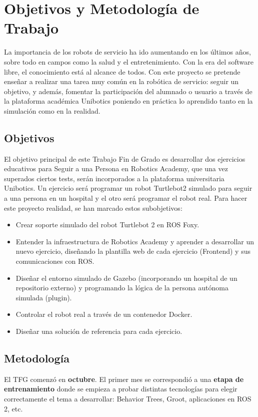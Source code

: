 \chapter{Objetivos y Metodología de Trabajo}
\label{cap:capitulo2}

La importancia de los robots de servicio ha ido aumentando en los últimos años, sobre todo en campos como la salud y el entretenimiento. Con la era del software libre, el conocimiento está al alcance de todos. Con este proyecto se pretende enseñar a realizar una tarea muy común en la robótica de servicio: seguir un objetivo, y además, fomentar la participación del alumnado o usuario a través de la plataforma académica Unibotics poniendo en práctica lo aprendido tanto en la simulación como en la realidad.

\section{Objetivos}
\label{sec:objetivos}
El objetivo principal de este Trabajo Fin de Grado es desarrollar dos ejercicios educativos para Seguir a una Persona en Robotics Academy, que una vez superados ciertos tests, serán incorporados a la plataforma universitaria Unibotics. Un ejercicio será programar un robot Turtlebot2 simulado para seguir a una persona en un hospital y el otro será programar el robot real. Para hacer este proyecto realidad, se han marcado estos subobjetivos:

\begin{itemize}
	\item Crear soporte simulado del robot Turtlebot 2 en ROS Foxy.
	\item Entender la infraestructura de Robotics Academy y aprender a desarrollar un nuevo ejercicio, diseñando la plantilla web de cada ejercicio (Frontend) y sus comunicaciones con ROS.
	\item Diseñar el entorno simulado de Gazebo (incorporando un hospital de un repositorio externo) y programando la lógica de la persona autónoma simulada (plugin).
	\item Controlar el robot real a través de un contenedor Docker.
	\item Diseñar una solución de referencia para cada ejercicio.
\end{itemize}


\section{Metodología}
\label{sec:metodologia}
El TFG comenzó en \textbf{octubre}. El primer mes se correspondió a una \textbf{etapa de entrenamiento} donde se empieza a probar distintas tecnologías para elegir correctamente el tema a desarrollar: Behavior Trees, Groot, aplicaciones en ROS 2, etc.\\

